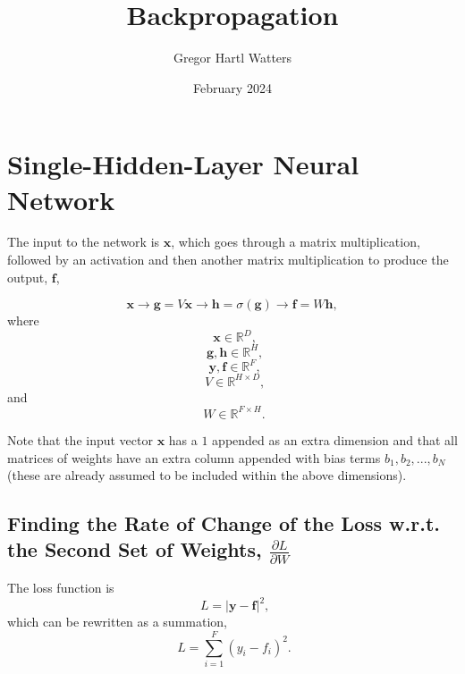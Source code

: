 \documentclass{article}
\title{Backpropagation}
\author{Gregor Hartl Watters}
\date{February 2024}
\begin{document}

\setlength{\parindent}{0pt}

\Large

\maketitle

\section{Single-Hidden-Layer Neural Network}
\label{sec:1hl}

\noindent

The input to the network is $\mathbf{x}$, which goes through a matrix multiplication, followed by an activation and then another matrix multiplication to produce the output, $\mathbf{f}$,

\begin{equation}
\label{eq:nn}
    \mathbf{x} \rightarrow \mathbf{g} = V\mathbf{x} \rightarrow \mathbf{h} = \sigma(\mathbf{g}) \rightarrow \mathbf{f} = W\mathbf{h},
\end{equation}
where
\begin{equation}
    \phantom{,}\mathbf{x} \in \mathbb{R}^D,
\end{equation}
\begin{equation}
    \phantom{,}\mathbf{g},\mathbf{h} \in \mathbb{R}^H,
\end{equation}
\begin{equation}
    \phantom{,}\mathbf{y},\mathbf{f} \in \mathbb{R}^F,
\end{equation}
\begin{equation}
    \phantom{,}V \in \mathbb{R}^{H \times D},
\end{equation}
and
\begin{equation}
    \phantom{.}W \in \mathbb{R}^{F \times H}.
\end{equation}

\vspace{10pt}
Note that the input vector $\mathbf{x}$ has a $1$ appended as an extra dimension and that all matrices of weights have an extra column appended with bias terms $b_1,b_2,...,b_N$ (these are already assumed to be included within the above dimensions).

\subsection{Finding the Rate of Change of the Loss w.r.t. the Second Set of Weights, \texorpdfstring{$\frac{\partial L}{\partial W}$}{dl/dW}}
The loss function is
\begin{equation}
    \phantom{,}L = \left|\mathbf{y} - \mathbf{f}\right|^2,
\end{equation}
which can be rewritten as a summation,
\begin{equation}
    \phantom{.}L = \displaystyle\sum_{i=1}^F (y_i - f_i)^2.
\end{equation}
\end{document}

